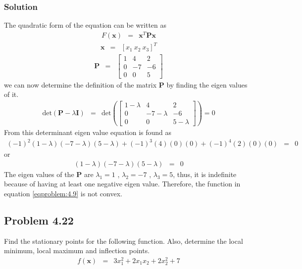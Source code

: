\documentclass[]{report}
\begin{document}
\subsubsection*{Solution}
The quadratic form of the equation can be written as
\begin{eqnarray*}
F\left(\mathbf{x}\right)&=&\mathbf{x}^T\mathbf{P}\mathbf{x}
\end{eqnarray*}
\begin{eqnarray*}
\mathbf{x}&=&\left[x_1 \  x_2 \  x_3\right]^T
\end{eqnarray*}
\begin{eqnarray*}
\mathbf{P}&=&\left[\begin{array}{ccc}
1& 4& 2 \\
0& -7& -6\\
0& 0& 5
\end{array}\right]
\end{eqnarray*}
we can now determine the definition of the matrix $\mathbf{P}$ by finding the eigen values of it.
\begin{eqnarray*}
\mathrm{det}\left(\mathbf{P}-\lambda \mathbf{I}\right)&=&\mathrm{det}\left(\left[\begin{array}{ccc}
1-\lambda& 4& 2 \\
0& -7-\lambda& -6\\
0& 0& 5-\lambda
\end{array}\right]\right)=0
\end{eqnarray*}
From this determinant eigen value equation is found as
\begin{eqnarray*}
\left(-1\right)^2\left(1-\lambda\right)\left(-7-\lambda\right)\left(5-\lambda\right)+\left(-1\right)^3\left(4\right)\left(0\right)\left(0\right)+\left(-1\right)^4\left(2\right)\left(0\right)\left(0\right)&=&0
\end{eqnarray*}
or
\begin{eqnarray*}
\left(1-\lambda\right)\left(-7-\lambda\right)\left(5-\lambda\right)&=&0
\end{eqnarray*}
The eigen values of the $\mathbf{P}$ are $\lambda_1=1$ , $\lambda_2=-7$ , $\lambda_3=5$, thus, it is indefinite because of having at least one negative eigen value. Therefore, the function in equation \ref{eqproblem:4.9} is not convex.
\subsection*{Problem 4.22}
Find the stationary points for the following function. Also, determine the local minimum, local maximum and inflection points.
\begin{eqnarray}
f\left(\mathbf{x}\right)&=&3x_1^2+2x_1x_2+2x_2^2+7
\label{eqproblem:4.22}
\end{eqnarray}
\end{document}
